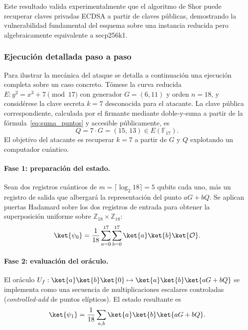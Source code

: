 Este resultado valida experimentalmente que el algoritmo de Shor puede recuperar claves privadas ECDSA a partir de claves públicas, demostrando la vulnerabilidad fundamental del esquema sobre una instancia reducida pero algebraicamente equivalente a secp256k1.

\subsubsection{Ejecución detallada paso a paso}
\label{sec:shor_worked}

Para ilustrar la mecánica del ataque se detalla a continuación una ejecución completa sobre un caso concreto. Tómese la curva reducida $E: y^2 = x^3 + 7 \pmod{17}$ con generador $G = (6, 11)$ y orden $n = 18$, y considérese la clave secreta $k = 7$ desconocida para el atacante. La clave pública correspondiente, calculada por el firmante mediante doble-y-suma a partir de la fórmula~\eqref{eq:suma_puntos} y accesible públicamente, es
\begin{equation}
  Q = 7 \cdot G = (15,\, 13) \in E(\mathbb{F}_{17}).
  \label{eq:Q_example}
\end{equation}
El objetivo del atacante es recuperar $k = 7$ a partir de $G$ y $Q$ explotando un computador cuántico.

\paragraph{Fase 1: preparación del estado.} Sean dos registros cuánticos de $m = \lceil \log_2 18 \rceil = 5$ qubits cada uno, más un registro de salida que albergará la representación del punto $aG + bQ$. Se aplican puertas Hadamard sobre los dos registros de entrada para obtener la superposición uniforme sobre $\mathbb{Z}_{18} \times \mathbb{Z}_{18}$:
\begin{equation}
  \ket{\psi_0} = \frac{1}{18} \sum_{a=0}^{17} \sum_{b=0}^{17} \ket{a} \ket{b} \ket{\mathcal{O}}.
\end{equation}

\paragraph{Fase 2: evaluación del oráculo.} El oráculo $U_f: \ket{a}\ket{b}\ket{0} \mapsto \ket{a}\ket{b}\ket{aG + bQ}$ se implementa como una secuencia de multiplicaciones escalares controladas (\emph{controlled-add} de puntos elípticos). El estado resultante es
\begin{equation}
  \ket{\psi_1} = \frac{1}{18} \sum_{a, b} \ket{a}\ket{b} \ket{aG + bQ}.
\end{equation}

